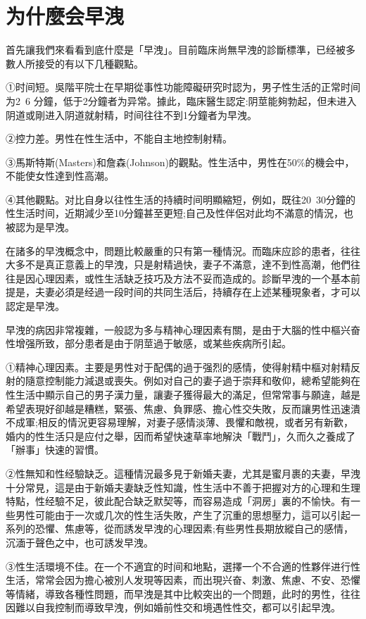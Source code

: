 \documentclass[12pt,UTF8]{ctexbook}
\begin{document}
\section{为什麼会早洩}

首先讓我們來看看到底什麼是「早洩」。目前臨床尚無早洩的診斷標準，已经被多數人所接受的有以下几種觀點。

①时间短。吳階平院士在早期從事性功能障礙研究时認为，男子性生活的正常时间为2~6 分鐘，低于2分鐘者为异常。據此，臨床醫生認定:阴莖能夠勃起，但未进入阴道或剛进入阴道就射精，时间往往不到1分鐘者为早洩。

②控力差。男性在性生活中，不能自主地控制射精。

③馬斯特斯(Masters)和詹森(Johnson)的觀點。性生活中，男性在50\%的機会中，不能使女性達到性高潮。

④其他觀點。对比自身以往性生活的持續时间明顯縮短，例如，既往20~30分鐘的性生活时间，近期減少至10分鐘甚至更短;自己及性伴侶对此均不滿意的情況，也被認为是早洩。

在諸多的早洩概念中，問題比較嚴重的只有第一種情況。而臨床应診的患者，往往大多不是真正意義上的早洩，只是射精過快，妻子不滿意，達不到性高潮，他們往往是因心理因素，或性生活缺乏技巧及方法不妥而造成的。診斷早洩的一个基本前提是，夫妻必須是经過一段时间的共同生活后，持續存在上述某種現象者，才可以認定是早洩。

早洩的病因非常複雜，一般認为多与精神心理因素有關，是由于大腦的性中樞兴奋性增强所致，部分患者是由于阴莖過于敏感，或某些疾病所引起。

①精神心理因素。主要是男性对于配偶的過于强烈的感情，使得射精中樞对射精反射的隨意控制能力減退或喪失。例如对自己的妻子過于崇拜和敬仰，總希望能夠在性生活中顯示自己的男子漢力量，讓妻子獲得最大的滿足，但常常事与願違，越是希望表現好卻越是糟糕，緊張、焦慮、負罪感、擔心性交失敗，反而讓男性迅速潰不成軍;相反的情況更容易理解，对妻子感情淡薄、畏懼和敵視，或者另有新歡，婚内的性生活只是应付之舉，因而希望快速草率地解決「戰鬥」，久而久之養成了「辦事」快速的習慣。

②性無知和性经驗缺乏。這種情況最多見于新婚夫妻，尤其是蜜月裹的夫妻，早洩十分常見，這是由于新婚夫妻缺乏性知識，性生活中不善于把握对方的心理和生理特點，性经驗不足，彼此配合缺乏默契等，而容易造成「洞房」裏的不愉快。有一些男性可能由于一次或几次的性生活失敗，产生了沉重的思想壓力，這可以引起一系列的恐懼、焦慮等，從而誘发早洩的心理因素;有些男性長期放縱自己的感情，沉湎于聲色之中，也可誘发早洩。

③性生活環境不佳。在一个不適宜的时间和地點，選擇一个不合適的性夥伴进行性生活，常常会因为擔心被別人发現等因素，而出現兴奋、刺激、焦慮、不安、恐懼等情緒，導致各種性問題，而早洩是其中比較突出的一个問題，此时的男性，往往因難以自我控制而導致早洩，例如婚前性交和境遇性性交，都可以引起早洩。
\end{document}
